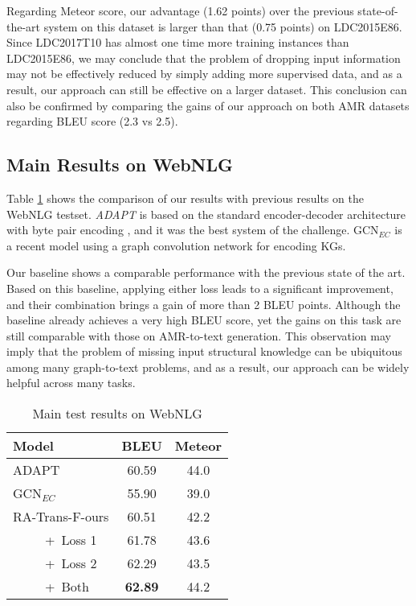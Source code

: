 \documentclass[11pt,a4paper]{article}
\begin{document}
Regarding Meteor score, our advantage (1.62 points) over the previous state-of-the-art system on this dataset is larger than that (0.75 points) on LDC2015E86.
Since LDC2017T10 has almost one time more training instances than LDC2015E86, we may conclude that the problem of dropping input information may not be effectively reduced by simply adding more supervised data, and as a result, our approach can still be effective on a larger dataset.
This conclusion can also be confirmed by comparing the gains of our approach on both AMR datasets regarding BLEU score (2.3 vs 2.5).


\subsection{Main Results on WebNLG}


Table \ref{tab:main_webnlg} shows the comparison of our results with previous results on the WebNLG testset.
\emph{ADAPT} \citep{gardent2017webnlg} is based on the standard encoder-decoder architecture \citep{cho2014learning} with byte pair encoding \citep{sennrich2016neural}, and it was the best system of the challenge.
GCN$_{EC}$ \citep{marcheggiani2018deep} is a recent model using a graph convolution network \citep{kipf2016semi} for encoding KGs.


Our baseline shows a comparable performance with the previous state of the art.
Based on this baseline, applying either loss leads to a significant improvement, and their combination brings a gain of more than 2 BLEU points.
Although the baseline already achieves a very high BLEU score, yet the gains on this task are still comparable with those on AMR-to-text generation.
This observation may imply that the problem of missing input structural knowledge can be ubiquitous among many graph-to-text problems, and as a result, our approach can be widely helpful across many tasks.


\begin{table}
    \centering
    \begin{tabular}{lcc}
    \toprule
    Model & BLEU & Meteor \\
    \midrule
    ADAPT & 60.59 & 44.0 \\
    GCN$_{EC}$ & 55.90 & 39.0 \\
    \midrule
    RA-Trans-F-ours & 60.51 & 42.2 \\
    ~~~~~+~Loss 1 & 61.78 & 43.6 \\
    ~~~~~+~Loss 2 & 62.29 & 43.5 \\
    ~~~~~+~Both & \textbf{62.89} & 44.2 \\
    \bottomrule
    \end{tabular}
    \caption{Main test results on WebNLG}
    \label{tab:main_webnlg}
\end{table}
\end{document}
